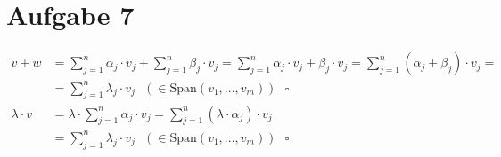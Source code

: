 \section{Aufgabe 7}

\begin{align*}
    v + w           &= \sum_{j = 1}^n\alpha_j \cdot v_j + \sum_{j = 1}^n\beta_j \cdot v_j = \sum_{j = 1}^n\alpha_j \cdot v_j + \beta_j \cdot v_j = \sum_{j = 1}^n(\alpha_j + \beta_j) \cdot v_j = \\
                    &= \sum_{j = 1}^n\lambda_j \cdot v_j \ \ \ (\in \text{Span}(v_1, ..., v_m)) \ \ \ \square \\[10pt]
    \lambda \cdot v &= \lambda \cdot \sum_{j = 1}^n\alpha_j \cdot v_j = \sum_{j = 1}^n(\lambda \cdot \alpha_j) \cdot v_j \\
                    &= \sum_{j = 1}^n\lambda_j \cdot v_j \ \ \ (\in \text{Span}(v_1, ..., v_m)) \ \ \ \square
\end{align*}
